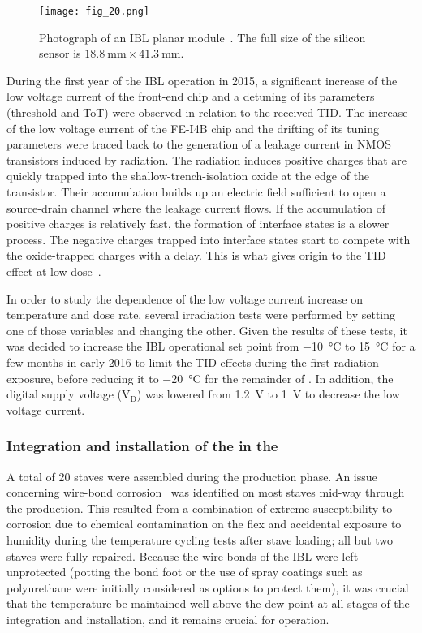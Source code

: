 \documentclass[cernpreprint, atlasdraft=false, UKenglish,british,orcidlogo, texmf, orcidlogo]{atlasdoc}
\begin{document}
\begin{figure}
\centering
\texttt{[image: fig\_20.png]}
\caption{Photograph of an IBL planar module~\cite{PIX-2018-001}. The full size of the silicon sensor is $\SI{18.8}{\mm}\times\SI{41.3}{\mm}$.}
\label{fig:ID-IBL_PlanarModule}
\end{figure}
 
During the first year of the \gls{IBL} operation in 2015, a significant increase of the low voltage current of the front-end chip and a detuning of its parameters (threshold and \gls{ToT}) were observed in relation to the received \gls{TID}. The increase of the low voltage current  of the FE-I4B chip and the drifting of its tuning parameters were traced back to the generation of a leakage current in \gls{NMOS} transistors induced by radiation. The radiation induces positive charges that are quickly trapped into the shallow-trench-isolation oxide at the edge of the transistor. Their accumulation builds up an electric field sufficient to open a source-drain channel where the leakage current flows. If the accumulation of positive charges is relatively fast, the formation of interface states is a slower process. The negative charges trapped into interface states start to compete with the oxide-trapped charges with a delay. This is what gives origin to the \gls{TID} effect at low dose~\cite{CYP}.
 
In order to study the dependence of the low voltage current increase on temperature and dose rate, several irradiation tests were performed by setting one of those variables and changing the other.
Given the results of these tests, it was decided to increase the \gls{IBL} operational set point from \SI{-10}{\degreeCelsius} to \SI[retain-explicit-plus]{+15}{\degreeCelsius} for a few months in early 2016 to limit the TID effects during the first radiation exposure, before reducing it to \SI{-20}{\degreeCelsius} for the remainder of \RunTwo.
In addition, the digital supply voltage (V$_{\mathrm{D}}$) was lowered from \SI{1.2}{\V} to \SI{1}{\V} to decrease the low voltage current.
 
\subsubsection{Integration and installation of the  in the }
\label{sec:IBL-Integration}
 
A total of \num{20} staves were assembled during the production phase. An issue concerning wire-bond corrosion~\cite{PIX-2018-001} was identified on most staves mid-way through the production.
This resulted from a combination of extreme susceptibility to corrosion due to chemical contamination on the flex and accidental exposure to humidity during the temperature cycling tests after stave loading; all but two staves were fully repaired.
Because the wire bonds of the \gls{IBL} were left unprotected (potting the bond foot or the use of spray coatings such as polyurethane were initially considered as options to protect them), it was crucial that the temperature be maintained well above the dew point at all stages of the integration and installation, and it remains crucial for operation.
 
\end{document}
